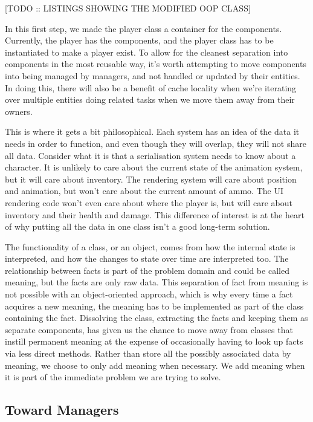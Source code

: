 \documentclass[a4paper,12pt]{article}
\begin{document}
[TODO :: LISTINGS SHOWING THE MODIFIED OOP CLASS]

In this first step, we made the player class a container for the components.
Currently, the player has the components, and the player class has to be instantiated to make a player exist.
To allow for the cleanest separation into components in the most reusable way, it's worth attempting to move components into being managed by managers, and not handled or updated by their entities.
In doing this, there will also be a benefit of cache locality when we're iterating over multiple entities doing related tasks when we move them away from their owners.

This is where it gets a bit philosophical.
Each system has an idea of the data it needs in order to function, and even though they will overlap, they will not share all data.
Consider what it is that a serialisation system needs to know about a character.
It is unlikely to care about the current state of the animation system, but it will care about inventory.
The rendering system will care about position and animation, but won't care about the current amount of ammo.
The UI rendering code won't even care about where the player is, but will care about inventory and their health and damage.
This difference of interest is at the heart of why putting all the data in one class isn't a good long-term solution.

The functionality of a class, or an object, comes from how the internal state is interpreted, and how the changes to state over time are interpreted too.
The relationship between facts is part of the problem domain and could be called meaning, but the facts are only raw data.
This separation of fact from meaning is not possible with an object-oriented approach, which is why every time a fact acquires a new meaning, the meaning has to be implemented as part of the class containing the fact.
Dissolving the class, extracting the facts and keeping them as separate components, has given us the chance to move away from classes that instill permanent meaning at the expense of occasionally having to look up facts via less direct methods.
Rather than store all the possibly associated data by meaning, we choose to only add meaning when necessary.
We add meaning when it is part of the immediate problem we are trying to solve.

\subsection{Toward Managers}
\end{document}
